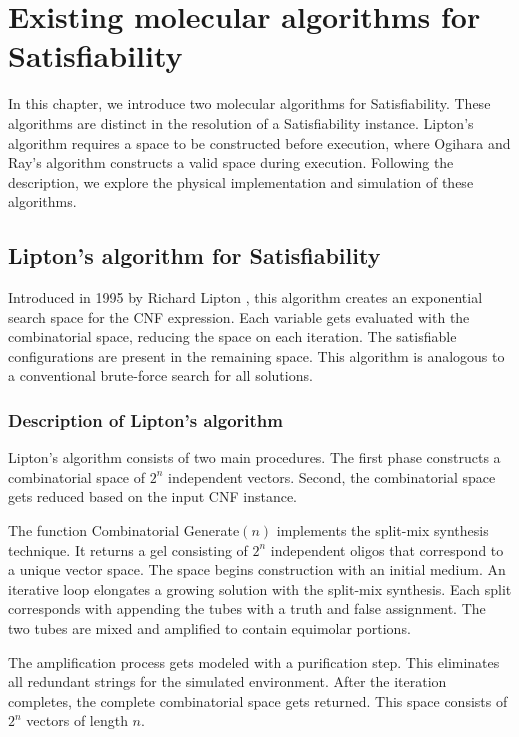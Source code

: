 \chapter{Existing molecular algorithms for {\sc Satisfiability}}


In this chapter, we introduce two molecular algorithms for {\sc Satisfiability}.  These algorithms are distinct in the resolution of a {\sc Satisfiability} instance.  Lipton's algorithm requires a space to be constructed before execution, where Ogihara and Ray's algorithm constructs a valid space during execution.  Following the description, we explore the physical implementation and simulation of these algorithms.
\section{Lipton's algorithm for {\sc Satisfiability}}

Introduced in 1995 by Richard Lipton \cite{Lipton95usingdna}, this algorithm creates an exponential search space for the CNF expression.  Each variable gets evaluated with the combinatorial space, reducing the space on each iteration.  The satisfiable configurations are present in the remaining space.  This algorithm is analogous to a conventional brute-force search for all solutions. 	
	\subsection{Description of Lipton's algorithm}
		
Lipton's algorithm consists of two main procedures.  The first phase constructs a combinatorial space of $2^n$ independent vectors.  Second, the combinatorial space gets reduced based on the input CNF instance. 		

The function {\sc Combinatorial Generate}$(n)$ implements the split-mix synthesis technique.  It returns a gel consisting of $2^n$ independent oligos that correspond to a unique vector space.  The space begins construction with an initial medium.  An iterative loop elongates a growing solution with the split-mix synthesis.  Each split corresponds with appending the tubes with a truth and false assignment.  The two tubes are mixed and amplified to contain equimolar portions.  

The amplification process gets modeled with a purification step.  This eliminates all redundant strings for the simulated environment.  After the iteration completes, the complete combinatorial space gets returned. This space consists of $2^n$ vectors of length $n$. 

